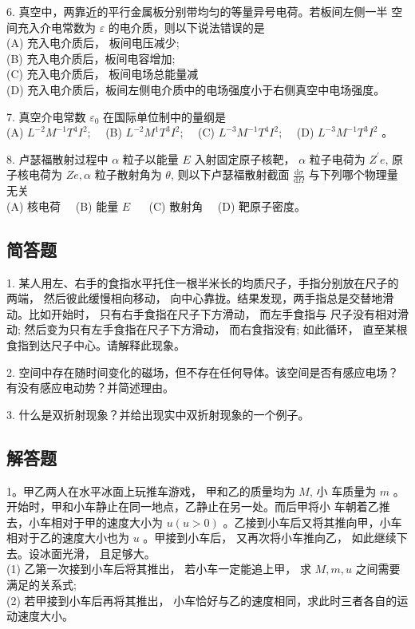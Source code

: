 6. 真空中，两靠近的平行金属板分别带均匀的等量异号电荷。若板间左侧一半 空间充入介电常数为 $\varepsilon$ 的电介质，则以下说法错误的是 \\
(A) 充入电介质后， 板间电压减少;\\
(B) 充入电介质后，板间电容增加;\\
(C) 充入电介质后， 板间电场总能量减\\
(D) 充入电介质后，板间左侧电介质中的电场强度小于右侧真空中电场强度。

7. 真空介电常数 $\varepsilon_{0}$ 在国际单位制中的量纲是\\
(A) $L^{-2} M^{-1} T^{4} I^{2}$;$\quad$
(B) $L^{-2} M^{1} T^{3} I^{2}$;$\quad$
(C) $L^{-3} M^{-1} T^{4} I^{2}$;$\quad$
(D) $L^{-3} M^{-1} T^{3} I^{2}$ 。

8. 卢瑟福散射过程中 $\alpha$ 粒子以能量 $E$ 入射固定原子核靶， $\alpha$ 粒子电荷为 $Z^{\prime} e$, 原子核电荷为 $Z e, \alpha$ 粒子散射角为 $\theta$, 则以下卢瑟福散射截面 $\frac{\mathrm{d} \sigma}{\mathrm{d} \Omega}$ 与下列哪个物理量无关\\
(A) 核电荷$\quad$
(B) 能量 $E$ $\quad$
(C) 散射角$\quad$
(D) 靶原子密度。
\subsection{简答题}
1.  某人用左、右手的食指水平托住一根半米长的均质尺子，手指分别放在尺子的两端， 然后彼此缓慢相向移动， 向中心靠拢。结果发现，两手指总是交替地滑动。比如开始时， 只有右手食指在尺子下方滑动， 而左手食指与 尺子没有相对滑动; 然后变为只有左手食指在尺子下方滑动， 而右食指没有; 如此循环， 直至某根食指到达尺子中心。请解释此现象。

2. 空间中存在随时间变化的磁场，但不存在任何导体。该空间是否有感应电场？有没有感应电动势？并简述理由。

3. 什么是双折射现象？并给出现实中双折射现象的一个例子。
\subsection{解答题}
1。甲乙两人在水平冰面上玩推车游戏， 甲和乙的质量均为 $M$, 小 车质量为 $m$ 。开始时，甲和小车静止在同一地点，乙静止在另一处。而后甲将小 车朝着乙推去，小车相对于甲的速度大小为 $u(u>0)$ 。乙接到小车后又将其推向甲，小车相对于乙的速度大小也为 $u$ 。甲接到小车后， 又再次将小车推向乙， 如此继续下去。设冰面光滑， 且足够大。\\
(1) 乙第一次接到小车后将其推出， 若小车一定能追上甲， 求 $M, m, u$ 之间需要满足的关系式;\\
(2) 若甲接到小车后再将其推出， 小车恰好与乙的速度相同，求此时三者各自的运动速度大小。

